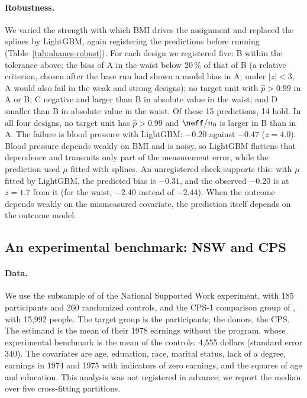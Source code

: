 \paragraph{Robustness.} We varied the strength with which BMI drives the assignment and replaced the splines by LightGBM, again registering the predictions before running (Table~\ref{tab:nhanes-robust}). For each design we registered five: B within the tolerance above; the bias of A in the waist below 20\,\% of that of B (a relative criterion, chosen after the base run had shown a model bias in A; under $|z|<3$, A would also fail in the weak and strong designs); no target unit with $\hat p>0.99$ in A or B; C negative and larger than B in absolute value in the waist; and D smaller than B in absolute value in the waist. Of these 15 predictions, 14 hold. In all four designs, no target unit has $\hat p>0.99$ and $\neff/n_0$ is larger in B than in A. The failure is blood pressure with LightGBM: $-0.20$ against $-0.47$ ($z=4.0$). Blood pressure depends weakly on BMI and is noisy, so LightGBM flattens that dependence and transmits only part of the measurement error, while the prediction used $\mu$ fitted with splines. An unregistered check supports this: with $\mu$ fitted by LightGBM, the predicted bias is $-0.31$, and the observed $-0.20$ is at $z=1.7$ from it (for the waist, $-2.40$ instead of $-2.44$). When the outcome depends weakly on the mismeasured covariate, the prediction itself depends on the outcome model.

\subsection{An experimental benchmark: NSW and CPS}\label{sec:lalonde}

\paragraph{Data.} We use the subsample of \citet{dehejia1999} of the National Supported Work experiment, with 185 participants and 260 randomized controls, and the CPS-1 comparison group of \citet{lalonde1986}, with 15{,}992 people. The target group is the participants; the donors, the CPS. The estimand is the mean of their 1978 earnings without the program, whose experimental benchmark is the mean of the controls: 4{,}555 dollars (standard error 340). The covariates are age, education, race, marital status, lack of a degree, earnings in 1974 and 1975 with indicators of zero earnings, and the squares of age and education. This analysis was not registered in advance; we report the median over five cross-fitting partitions.

